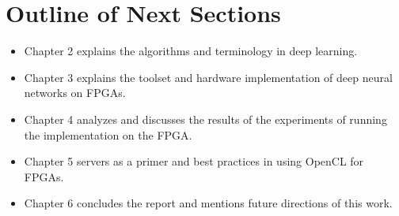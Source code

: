 
\section{Outline of Next Sections}

\begin{itemize}

\item Chapter 2 explains the algorithms and terminology in deep learning. 

\item Chapter 3 explains the toolset and hardware implementation of deep neural networks on FPGAs.

\item Chapter 4 analyzes and discusses the results of the experiments of running the implementation on the FPGA.

\item Chapter 5 servers as a primer and best practices in using OpenCL for FPGAs.

\item Chapter 6 concludes the report and mentions future directions of this work.

\end{itemize}


